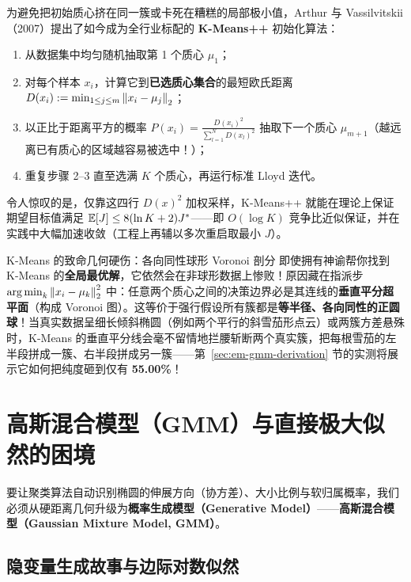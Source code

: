 为避免把初始质心挤在同一簇或卡死在糟糕的局部极小值，Arthur 与 Vassilvitskii（2007）提出了如今成为全行业标配的 \textbf{K-Means++} 初始化算法：
\begin{enumerate}
  \item 从数据集中均匀随机抽取第 1 个质心 $\mu_1$；
  \item 对每个样本 $x_i$，计算它到\textbf{已选质心集合}的最短欧氏距离 $D(x_i) := \min_{1 \le j \le m} \left\|x_i - \mu_j\right\|_2$；
  \item 以正比于距离平方的概率 $P(x_i) = \frac{D(x_i)^2}{\sum_{l=1}^N D(x_l)^2}$ 抽取下一个质心 $\mu_{m+1}$（越远离已有质心的区域越容易被选中！）；
  \item 重复步骤 2--3 直至选满 $K$ 个质心，再运行标准 Lloyd 迭代。
\end{enumerate}
令人惊叹的是，仅靠这四行 $D(x)^2$ 加权采样，K-Means++ 就能在理论上保证期望目标值满足 $\mathbb{E}[J] \le 8(\ln K + 2) J^*$——即 $O(\log K)$ 竞争比近似保证，并在实践中大幅加速收敛（工程上再辅以多次重启取最小 $J$）。

\begin{failBox}{K-Means 的致命几何硬伤：各向同性球形 Voronoi 剖分}
即使拥有神谕帮你找到 K-Means 的\textbf{全局最优解}，它依然会在非球形数据上惨败！原因藏在指派步 $\operatorname*{arg\,min}_k \left\|x_i - \mu_k\right\|_2^2$ 中：任意两个质心之间的决策边界必是其连线的\textbf{垂直平分超平面}（构成 Voronoi 图）。这等价于强行假设所有簇都是\textbf{等半径、各向同性的正圆球}！当真实数据呈细长倾斜椭圆（例如两个平行的斜雪茄形点云）或两簇方差悬殊时，K-Means 的垂直平分线会毫不留情地拦腰斩断两个真实簇，把每根雪茄的左半段拼成一簇、右半段拼成另一簇——第~\ref{sec:em-gmm-derivation} 节的实测将展示它如何把纯度砸到仅有 \textbf{55.00\%}！
\end{failBox}

\section{高斯混合模型（GMM）与直接极大似然的困境}\label{sec:em-gmm}

要让聚类算法自动识别椭圆的伸展方向（协方差）、大小比例与软归属概率，我们必须从硬距离几何升级为\textbf{概率生成模型（Generative Model）}——\textbf{高斯混合模型（Gaussian Mixture Model, GMM）}。

\subsection{隐变量生成故事与边际对数似然}

